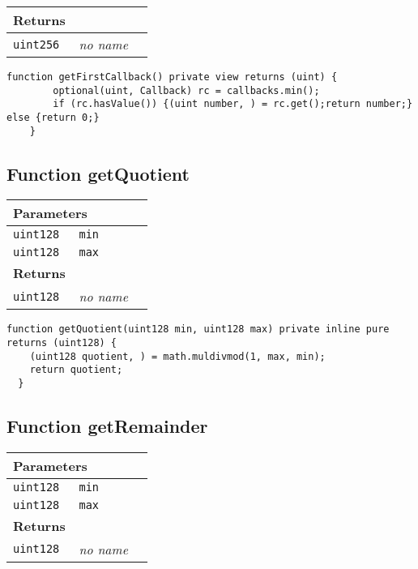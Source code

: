 \ifsoltables
\noindent\begin{tabular}{|l|l|p{5cm}|}\hline
\multicolumn{3}{|l|}{\bf Returns}\\\hline
\tt uint256 & {\em no name} &\\\hline
\end{tabular}
\fi

\vspace{2cm}

\begin{lstlisting}[firstnumber=242]
  function getFirstCallback() private view returns (uint) {
		optional(uint, Callback) rc = callbacks.min();
		if (rc.hasValue()) {(uint number, ) = rc.get();return number;} else {return 0;}
	}
\end{lstlisting}

\subsection{Function getQuotient}


\ifsoltables
\noindent\begin{tabular}{|l|l|p{5cm}|}\hline
\multicolumn{3}{|l|}{\bf Parameters}\\\hline
\tt uint128 & \tt min &\\\hline
\tt uint128 & \tt max &\\\hline
\multicolumn{3}{|l|}{\bf Returns}\\\hline
\tt uint128 & {\em no name} &\\\hline
\end{tabular}
\fi

\vspace{2cm}

\begin{lstlisting}[firstnumber=165]
  function getQuotient(uint128 min, uint128 max) private inline pure returns (uint128) {
    (uint128 quotient, ) = math.muldivmod(1, max, min);
    return quotient;
  }
\end{lstlisting}

\subsection{Function getRemainder}


\ifsoltables
\noindent\begin{tabular}{|l|l|p{5cm}|}\hline
\multicolumn{3}{|l|}{\bf Parameters}\\\hline
\tt uint128 & \tt min &\\\hline
\tt uint128 & \tt max &\\\hline
\multicolumn{3}{|l|}{\bf Returns}\\\hline
\tt uint128 & {\em no name} &\\\hline
\end{tabular}
\fi

